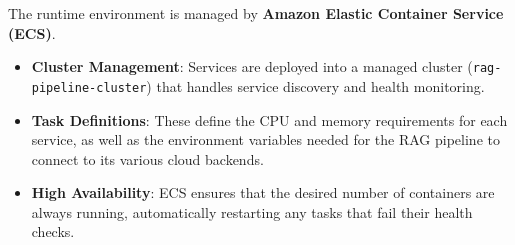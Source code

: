 The runtime environment is managed by \textbf{Amazon Elastic Container Service (ECS)}. 
\begin{itemize}
    \item \textbf{Cluster Management}: Services are deployed into a managed cluster (\texttt{rag-pipeline-cluster}) that handles service discovery and health monitoring.
    \item \textbf{Task Definitions}: These define the CPU and memory requirements for each service, as well as the environment variables needed for the RAG pipeline to connect to its various cloud backends.
    \item \textbf{High Availability}: ECS ensures that the desired number of containers are always running, automatically restarting any tasks that fail their health checks.
\end{itemize}

\newpage